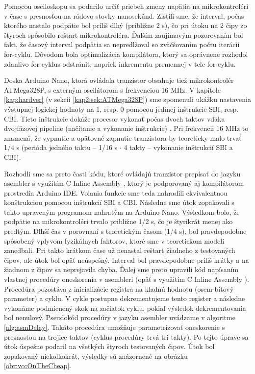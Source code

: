 Pomocou osciloskopu sa podarilo určiť priebeh zmeny napätia na mikrokontroléri v čase s presnosťou na rádovo stovky nanosekúnd. Zistili sme, že interval, počas ktorého nastalo podpätie bol príliš dlhý (približne 2 {\textmu}s), čo pri útoku na 2 čipy zo štyroch spôsobilo reštart mikrokontroléra. Ďalším zaujímavým pozorovaním bol fakt, že časový interval podpätia sa nepredlžoval so zväčšovaním počtu iterácií  for-cyklu. Dôvodom bola optimalizácia kompilátora, ktorý sa oprávnene rozhodol zdanlivo  for-cyklus odstrániť, napriek inkrementu premennej  v tele for-cyklu.

Doska Arduino Nano, ktorá ovládala tranzistor obsahuje tiež mikrokontrolér ATMega328P, s externým oscilátorom s frekvenciou 16 MHz. V kapitole \ref{kap:hardver} (v sekcii \ref{kap2:sek:ATMega328P}) sme spomenuli ukážku nastavenia výstupnej logickej hodnoty na 1, resp. 0 pomocou jedinej inštrukcie SBI, resp. CBI. Tieto inštrukcie dokáže procesor vykonať počas dvoch taktov vďaka dvojfázovej pipeline (načítanie a vykonanie inštrukcie) \cite{atmegaData}. Pri frekvencii 16 MHz to znamená, že vypnutie a opätovné zapnutie tranzistora by teoreticky malo trvať 1/4 {\textmu}s (perióda jedného taktu -- 1/16 {\textmu}s $\cdot$ 4 takty -- vykonanie inštrukcií SBI a CBI). 

Rozhodli sme sa preto časti kódu, ktoré ovládajú tranzistor prepísať do jazyku asembler s využitím C Inline Assembly \cite{inlineAsm}, ktorý je podporovaný aj kompilátorom prostredia Arduino IDE. Volania funkcie  sme teda nahradili ekvivalentnou konštrukciou pomocou inštrukcií SBI a CBI. Následne sme útok zopakovali s takto upraveným programom nahratým na Arduino Nano. Výsledkom bolo, že podpätie na mikrokontroléri trvalo približne 1/2 {\textmu}s, čo je štyrikrát menej ako predtým. Dlhší čas v porovnaní s teoretickým časom (1/4 {\textmu}s), bol pravdepodobne spôsobený vplyvom fyzikálnych faktorov, ktoré sme v teoretickom modeli zanedbali. Pri takto krátkom čase už nenastal reštart žiadneho z testovaných čipov, ale útok bol opäť neúspešný. Interval bol pravdepodobne príliš krátky a na žiadnom z čipov sa neprejavila chyba. Ďalej sme preto upravili kód napísaním vlastnej procedúry oneskorenia v asembleri (opäť s využitím C Inline Assembly \cite{inlineAsm}). Procedúra pozostáva z inicializácie registra na kladnú hodnotu (osem-bitový parameter) a cyklu. V cykle postupne dekrementujeme tento register a následne vykonáme podmienený skok na začiatok cyklu, pokiaľ výsledok dekrementovania bol nenulový. Pseudokód procedúry v jazyku asembler uvádzame v algoritme \ref{alg:asmDelay}. Takáto procedúra umožňuje parametrizovať oneskorenie s presnosťou na trojice taktov (cyklus procedúry trvá tri takty). Po tejto úprave sa útok úspešne podaril na všetkých štyroch testovaných čipov. Útok bol zopakovaný niekoľkokrát, výsledky sú znázornené na obrázku \ref{obr:vccOnTheCheap}.

